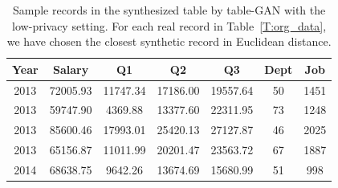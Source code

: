 \begin{table}[t]
\centering
\caption{Sample records in the synthesized table by table-GAN with the low-privacy setting. For each real record in Table~\ref{T:org_data}, we have chosen the closest synthetic record in Euclidean distance.\label{T:syn_data}}
\begin{tabular}{|c|c|c|c|c|c|c|}
\hline
       Year  & Salary  & Q1 & Q2 & Q3 & Dept & Job \\ \hline 
2013& 72005.93  & 11747.34 & 17186.00 & 19557.64 & 50 & 1451 \\
2013 & 59747.90  & 4369.88  & 13377.60 & 22311.95 & 73 & 1248 \\
2013 & 85600.46  & 17993.01 & 25420.13 & 27127.87 & 46 & 2025 \\
2013 & 65156.87  & 11011.99 & 20201.47 & 23563.72 & 67 & 1887 \\
2014 & 68638.75  & 9642.26  & 13674.69 & 15680.99 & 51 & 998  \\

\end{tabular}
\end{table}

